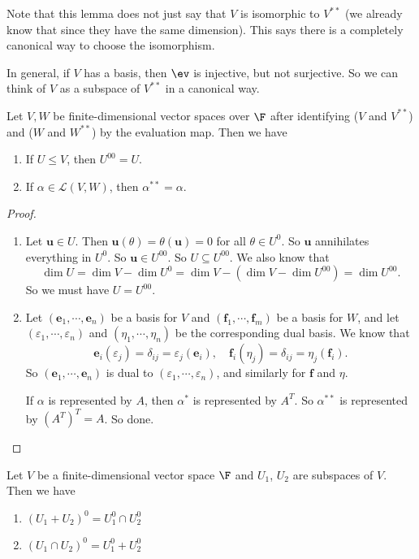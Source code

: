 \documentclass[a4paper]{article}
\begin{document}
Note that this lemma does not just say that $V$ is isomorphic to $V^{**}$ (we already know that since they have the same dimension). This says there is a completely canonical way to choose the isomorphism.

In general, if $V$ has a basis, then $\ev$ is injective, but not surjective. So we can think of $V$ as a subspace of $V^{**}$ in a canonical way.

\begin{lemma}
  Let $V, W$ be finite-dimensional vector spaces over $\F$ after identifying ($V$ and $V^{**}$) and ($W$ and $W^{**}$) by the evaluation map. Then we have
  \begin{enumerate}
    \item If $U\leq V$, then $U^{00} = U$.
    \item If $\alpha\in \mathcal{L}(V, W)$, then $\alpha^{**} = \alpha$.
  \end{enumerate}
\end{lemma}

\begin{proof}\leavevmode
  \begin{enumerate}
    \item Let $\mathbf{u} \in U$. Then $\mathbf{u}(\theta) = \theta(\mathbf{u}) = 0$ for all $\theta \in U^0$. So $\mathbf{u}$ annihilates everything in $U^0$. So $\mathbf{u} \in U^{00}$. So $U \subseteq U^{00}$. We also know that
      \[
        \dim U = \dim V  - \dim U^0 = \dim V - (\dim V - \dim U^{00}) = \dim U^{00}.
      \]
      So we must have $U = U^{00}$.
    \item Let $(\mathbf{e}_1, \cdots, \mathbf{e}_n)$ be a basis for $V$ and $(\mathbf{f}_1, \cdots, \mathbf{f}_m)$ be a basis for $W$, and let $(\varepsilon_1, \cdots, \varepsilon_n)$ and $(\eta_1, \cdots, \eta_n)$ be the corresponding dual basis. We know that
      \[
        \mathbf{e}_i(\varepsilon_j) = \delta_{ij} = \varepsilon_j(\mathbf{e}_i),\quad \mathbf{f}_i(\eta_j) = \delta_{ij} = \eta_j(\mathbf{f}_i).
      \]
      So $(\mathbf{e}_1, \cdots, \mathbf{e}_n)$ is dual to $(\varepsilon_1, \cdots, \varepsilon_n)$, and similarly for $\mathbf{f}$ and $\eta$.

      If $\alpha$ is represented by $A$, then $\alpha^*$ is represented by $A^T$. So $\alpha^{**}$ is represented by $(A^T)^T = A$. So done.
  \end{enumerate}
\end{proof}

\begin{prop}
  Let $V$ be a finite-dimensional vector space $\F$ and $U_1$, $U_2$ are subspaces of $V$. Then we have
  \begin{enumerate}
    \item $(U_1 + U_2)^0 = U_1^0 \cap U_2^0$
    \item $(U_1 \cap U_2)^0 = U_1^0 + U_2^0$
  \end{enumerate}
\end{prop}
\end{document}
